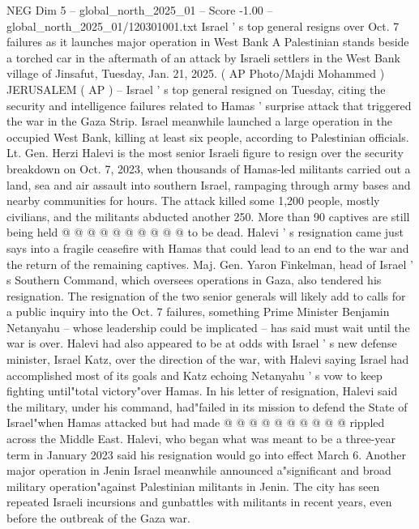 \begin{textsample}{NEG Dim 5 – global\_north\_2025\_01 – Score -1.00 – global\_north\_2025\_01/120301001.txt}  \label{ex:f5_neg_079}
Israel ' s top general resigns over Oct. 7 failures as it launches major operation in West Bank A Palestinian stands beside a torched car in the aftermath of an attack by Israeli settlers in the West Bank village of Jinsafut, Tuesday, Jan. 21, 2025. ( AP Photo/Majdi Mohammed ) JERUSALEM ( AP ) -- Israel ' s top general resigned on Tuesday, citing the security and intelligence failures related to Hamas ' surprise attack that triggered the war in the Gaza Strip.
Israel meanwhile launched a large operation in the occupied West Bank, killing at least six people, according to Palestinian officials.
Lt.
Gen.
Herzi Halevi is the most senior Israeli figure to resign over the security breakdown on Oct. 7, 2023, when thousands of Hamas-led militants carried out a land, sea and air assault into southern Israel, rampaging through army bases and nearby communities for hours.
The attack killed some 1,200 people, mostly civilians, and the militants abducted another 250.
More than 90 captives are still being held @ @ @ @ @ @ @ @ @ @ to be dead.
Halevi ' s resignation came just says into a fragile ceasefire with Hamas that could lead to an end to the war and the return of the remaining captives.
Maj.
Gen.
Yaron Finkelman, head of Israel ' s Southern Command, which oversees operations in Gaza, also tendered his resignation.
The resignation of the two senior generals will likely add to calls for a public inquiry into the Oct. 7 failures, something Prime Minister Benjamin Netanyahu -- whose leadership could be implicated -- has said must wait until the war is over.
Halevi had also appeared to be at odds with Israel ' s new defense minister, Israel Katz, over the direction of the war, with Halevi saying Israel had accomplished most of its goals and Katz echoing Netanyahu ' s vow to keep fighting until"total victory"over Hamas.
In his letter of resignation, Halevi said the military, under his command, had"failed in its mission to defend the State of Israel"when Hamas attacked but had made @ @ @ @ @ @ @ @ @ @ rippled across the Middle East.
Halevi, who began what was meant to be a three-year term in January 2023 said his resignation would go into effect March 6.
Another major operation in Jenin Israel meanwhile announced a"significant and broad military operation"against Palestinian militants in Jenin.
The city has seen repeated Israeli incursions and gunbattles with militants in recent years, even before the outbreak of the Gaza war.

\end{textsample}
